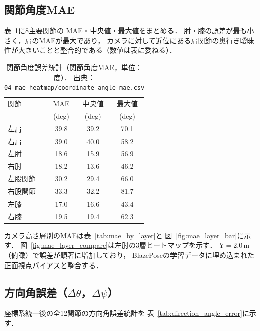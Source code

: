 \documentclass[twocolumn]{article}
\begin{document}
\subsection{関節角度MAE}

表~\ref{tab:joint_angle_error}に8主要関節の
MAE・中央値・最大値をまとめる．
肘・膝の誤差が最も小さく，肩のMAEが最大であり，
カメラに対して近位にある肩関節の奥行き曖昧性が大きいことと整合的である（数値は表に委ねる）．

\begin{table}[!t]
\centering
\caption{関節角度誤差統計（関節角度MAE，単位：度）．
  出典：\texttt{04\_mae\_heatmap/coordinate\_angle\_mae.csv}}
\label{tab:joint_angle_error}
\begin{tabular}{lccc}
\toprule
関節          & MAE    & 中央値 & 最大値  \\
              & (deg)  & (deg)  & (deg)  \\
\midrule
左肩  & 39.8   & 39.2   & 70.1   \\
右肩  & 39.0   & 40.0   & 58.2   \\
左肘  & 18.6   & 15.9   & 56.9   \\
右肘  & 18.2   & 13.6   & 46.2   \\
左股関節  & 30.2   & 29.4   & 66.0   \\
右股関節  & 33.3   & 32.2   & 81.7   \\
左膝  & 17.0   & 16.6   & 43.4   \\
右膝  & 19.5   & 19.4   & 62.3   \\
\bottomrule
\end{tabular}
\end{table}

カメラ高さ層別のMAEは表~\ref{tab:mae_by_layer}と
図~\ref{fig:mae_layer_bar}に示す．
図~\ref{fig:mae_layer_compare}は左肘の3層ヒートマップを示す．
Y$=$2.0\,m（俯瞰）で誤差が顕著に増加しており，
BlazePoseの学習データに埋め込まれた正面視点バイアスと整合する．

\subsection{方向角誤差（$\Delta\theta$，$\Delta\psi$）}

座標系統一後の全12関節の方向角誤差統計を
表~\ref{tab:direction_angle_error}に示す．
\end{document}
